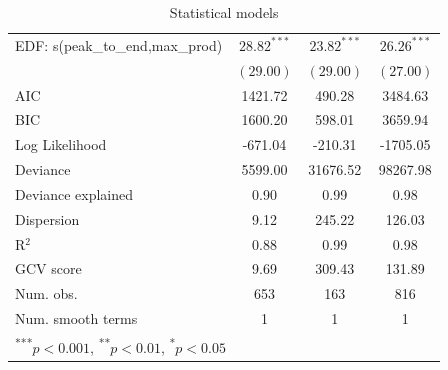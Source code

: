 \documentclass[12pt]{article}
\begin{document}
\begin{table}
\begin{center}
\begin{tabular}{l c c c }
EDF: s(peak_to_end,max_prod) & $28.82^{***}$ & $23.82^{***}$ & $26.26^{***}$ \\
                             & $(29.00)$     & $(29.00)$     & $(27.00)$     \\
\hline
AIC                          & 1421.72       & 490.28        & 3484.63       \\
BIC                          & 1600.20       & 598.01        & 3659.94       \\
Log Likelihood               & -671.04       & -210.31       & -1705.05      \\
Deviance                     & 5599.00       & 31676.52      & 98267.98      \\
Deviance explained           & 0.90          & 0.99          & 0.98          \\
Dispersion                   & 9.12          & 245.22        & 126.03        \\
R$^2$                        & 0.88          & 0.99          & 0.98          \\
GCV score                    & 9.69          & 309.43        & 131.89        \\
Num. obs.                    & 653           & 163           & 816           \\
Num. smooth terms            & 1             & 1             & 1             \\
\hline
\multicolumn{4}{l}{\scriptsize{\textsuperscript{***}$p<0.001$, 
  \textsuperscript{**}$p<0.01$, 
  \textsuperscript{*}$p<0.05$}}
\end{tabular}
\caption{Statistical models}
\label{table:postpeak}
\end{center}
\end{table}

\end{document}
